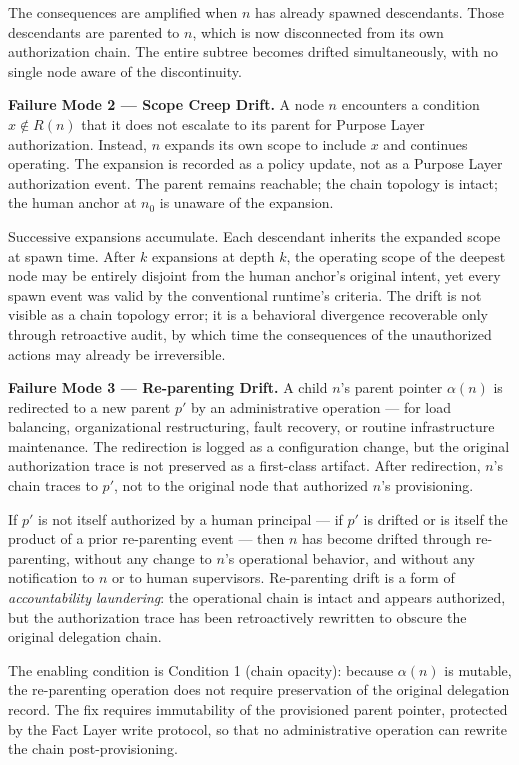 The consequences are amplified when $n$ has already spawned descendants. Those descendants are parented to $n$, which is now disconnected from its own authorization chain. The entire subtree becomes drifted simultaneously, with no single node aware of the discontinuity.

\medskip
\noindent\textbf{Failure Mode 2 — Scope Creep Drift.}
A node $n$ encounters a condition $x \notin R(n)$ that it does not escalate to its parent for Purpose Layer authorization. Instead, $n$ expands its own scope to include $x$ and continues operating. The expansion is recorded as a policy update, not as a Purpose Layer authorization event. The parent remains reachable; the chain topology is intact; the human anchor at $n_0$ is unaware of the expansion.

Successive expansions accumulate. Each descendant inherits the expanded scope at spawn time. After $k$ expansions at depth $k$, the operating scope of the deepest node may be entirely disjoint from the human anchor's original intent, yet every spawn event was valid by the conventional runtime's criteria. The drift is not visible as a chain topology error; it is a behavioral divergence recoverable only through retroactive audit, by which time the consequences of the unauthorized actions may already be irreversible.

\medskip
\noindent\textbf{Failure Mode 3 — Re-parenting Drift.}
A child $n$'s parent pointer $\alpha(n)$ is redirected to a new parent $p'$ by an administrative operation — for load balancing, organizational restructuring, fault recovery, or routine infrastructure maintenance. The redirection is logged as a configuration change, but the original authorization trace is not preserved as a first-class artifact. After redirection, $n$'s chain traces to $p'$, not to the original node that authorized $n$'s provisioning.

If $p'$ is not itself authorized by a human principal — if $p'$ is drifted or is itself the product of a prior re-parenting event — then $n$ has become drifted through re-parenting, without any change to $n$'s operational behavior, and without any notification to $n$ or to human supervisors. Re-parenting drift is a form of \emph{accountability laundering}: the operational chain is intact and appears authorized, but the authorization trace has been retroactively rewritten to obscure the original delegation chain.

The enabling condition is Condition 1 (chain opacity): because $\alpha(n)$ is mutable, the re-parenting operation does not require preservation of the original delegation record. The fix requires immutability of the provisioned parent pointer, protected by the Fact Layer write protocol, so that no administrative operation can rewrite the chain post-provisioning.

